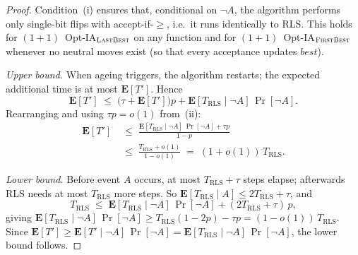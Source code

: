 \documentclass[lettersize,journal]{IEEEtran}
\newcommand{\firstBest}{$(1+1)$~Opt-IA$_{\textsc{FirstBest}}$}
\newcommand{\lastBest}{$(1+1)$~Opt-IA$_{\textsc{LastBest}}$}
\begin{document}
\begin{proof}
Condition~(i) ensures that, conditional on $\lnot A$, the algorithm performs
only single-bit flips with accept-if-$\geq$, i.e.\ it runs identically to RLS.
This holds for \lastBest{} on any function and for \firstBest{} whenever
no neutral moves exist (so that every acceptance updates $\mathit{best}$).

\textit{Upper bound.}
When ageing triggers, the algorithm restarts; the expected additional time is
at most $\mathbf{E}[T']$.  Hence
\[
  \mathbf{E}[T'] \;\leq\;
    \bigl(\tau + \mathbf{E}[T']\bigr)p
    + \mathbf{E}[T_{\mathrm{RLS}}\mid\lnot A]\,\Pr[\lnot A].
\]
Rearranging and using $\tau p=o(1)$ from~(ii):
\begin{align*}
  \mathbf{E}[T'] &\;\leq\;
  \frac{\mathbf{E}[T_{\mathrm{RLS}}\mid\lnot A]\,\Pr[\lnot A]+\tau p}{1-p}\\
 & \;\leq\;
  \frac{T_{\mathrm{RLS}}+o(1)}{1-o(1)}
  \;=\; (1+o(1))\,T_{\mathrm{RLS}}.
\end{align*}

\textit{Lower bound.}
Before event $A$ occurs, at most $T_{\mathrm{RLS}}+\tau$ steps elapse;
afterwards RLS needs at most $T_{\mathrm{RLS}}$ more steps.  So
$\mathbf{E}[T_{\mathrm{RLS}}\mid A]\leq 2T_{\mathrm{RLS}}+\tau$, and
\[
  T_{\mathrm{RLS}} \;\leq\;
    \mathbf{E}[T_{\mathrm{RLS}}\mid\lnot A]\,\Pr[\lnot A]
    + (2T_{\mathrm{RLS}}+\tau)\,p,
\]
giving $\mathbf{E}[T_{\mathrm{RLS}}\mid\lnot A]\,\Pr[\lnot A]
\geq T_{\mathrm{RLS}}(1-2p)-\tau p=(1-o(1))\,T_{\mathrm{RLS}}$.
Since $\mathbf{E}[T']\geq\mathbf{E}[T'\mid\lnot A]\,\Pr[\lnot A]
=\mathbf{E}[T_{\mathrm{RLS}}\mid\lnot A]\,\Pr[\lnot A]$, the lower bound
follows.
\end{proof}
\end{document}
